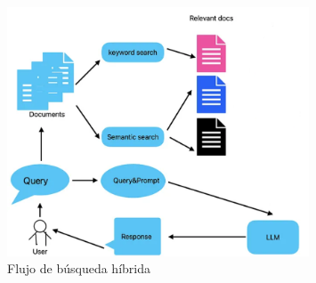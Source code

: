 \begin{figure}[h]
	\centering
	\includegraphics[width=0.8\textwidth]{figs/hybrid_search.png}
	\caption{Flujo de búsqueda híbrida}
	\label{fig:context-anoni1}
\end{figure}

